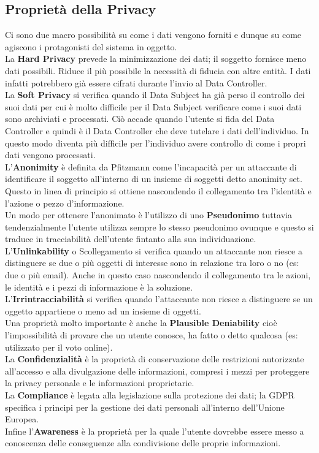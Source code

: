 \subsection{Proprietà della Privacy}
Ci sono due macro possibilità su come i dati vengono forniti e dunque su come agiscono i protagonisti del sistema in oggetto.\\
La \textbf{Hard Privacy} prevede la minimizzazione dei dati; il soggetto fornisce meno dati possibili.
Riduce il più possibile la necessità di fiducia con altre entità.
I dati infatti potrebbero già essere cifrati durante l'invio al Data Controller.\\
La \textbf{Soft Privacy} si verifica quando il Data Subject ha già perso il controllo dei suoi dati per cui è molto difficile per il Data Subject verificare come i suoi dati sono archiviati e processati.
Ciò accade quando l'utente si fida del Data Controller e quindi è il Data Controller che deve tutelare i dati dell'individuo.
In questo modo diventa più difficile per l'individuo avere controllo di come i propri dati vengono processati.\\
L'\textbf{Anonimity} è definita da Pfitzmann come l'incapacità per un attaccante di identificare il soggetto all'interno di un insieme di soggetti detto anonimity set.
Questo in linea di principio si ottiene nascondendo il collegamento tra l'identità e l'azione o pezzo d'informazione.\\
Un modo per ottenere l'anonimato è l'utilizzo di uno \textbf{Pseudonimo} tuttavia tendenzialmente l'utente utilizza sempre lo stesso pseudonimo ovunque e questo si traduce in tracciabilità dell'utente fintanto alla sua individuazione.\\
L'\textbf{Unlinkability} o Scollegamento si verifica quando un attaccante non riesce a distinguere se due o più oggetti di interesse sono in relazione tra loro o no (es: due o più email).
Anche in questo caso nascondendo il collegamento tra le azioni, le identità e i pezzi di informazione è la soluzione.\\
L'\textbf{Irrintracciabilità} si verifica quando l'attaccante non riesce a distinguere se un oggetto appartiene o meno ad un insieme di oggetti.\\
Una proprietà molto importante è anche la \textbf{Plausible Deniability} cioè l'impossibilità di provare che un utente conosce, ha fatto o detto qualcosa (es: utilizzato per il voto online).\\
La \textbf{Confidenzialità} è la proprietà di conservazione delle restrizioni autorizzate all'accesso e alla divulgazione delle informazioni, compresi i mezzi per proteggere la privacy personale e le informazioni proprietarie.\\
La \textbf{Compliance} è legata alla legislazione sulla protezione dei dati; la \acrshort{GDPR} specifica i principi per la gestione dei dati personali all'interno dell'Unione Europea.\\
Infine l'\textbf{Awareness} è la proprietà per la quale l'utente dovrebbe essere messo a conoscenza delle conseguenze alla condivisione delle proprie informazioni.


